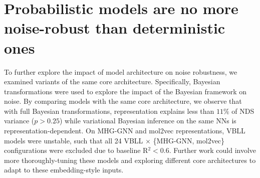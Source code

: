 \section{Probabilistic models are no more noise-robust than deterministic ones}

To further explore the impact of model architecture on noise robustness, we examined variants of the same core architecture. Specifically, Bayesian transformations were used to explore the impact of the Bayesian framework on noise. By comparing models with the same core architecture, we observe that with full Bayesian transformations, representation explains less than $11\%$ of NDS variance ($p > 0.25$) while variational Bayesian inference on the same NNs is representation-dependent. On MHG-GNN and mol2vec representations, VBLL models were unstable, such that all 24 VBLL $\times$ \{MHG-GNN, mol2vec\} configurations were excluded due to baseline R$^2 < 0.6$. Further work could involve more thoroughly-tuning these models and exploring different core architectures to adapt to these embedding-style inputs. 

